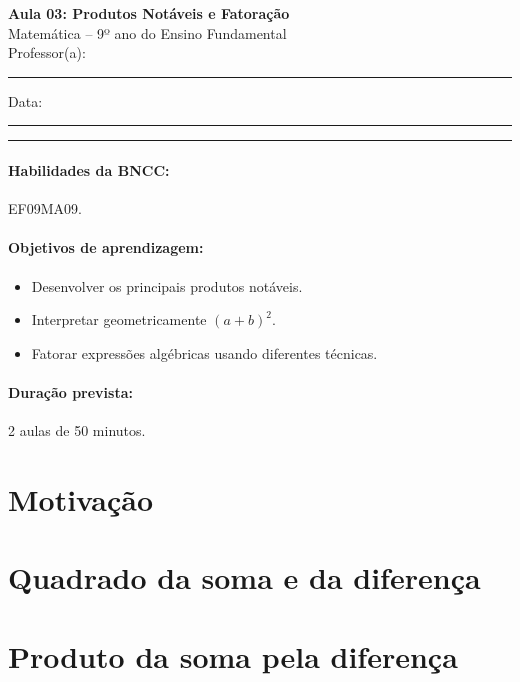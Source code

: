 \documentclass[11pt,a4paper]{article}
\newcommand{\numaula}{03}
\newcommand{\tituloaula}{Produtos Notáveis e Fatoração}
\begin{document}
\begin{center}
  {\Large\bfseries Aula \numaula: \tituloaula}\\[4pt]
  {\large Matemática -- 9º ano do Ensino Fundamental}\\[2pt]
  Professor(a): \rule{6cm}{0.4pt} \qquad Data: \rule{3cm}{0.4pt}
\end{center}
\noindent\rule{\linewidth}{0.8pt}

\paragraph{Habilidades da BNCC:} EF09MA09.

\paragraph{Objetivos de aprendizagem:}
\begin{itemize}[nosep]
  \item Desenvolver os principais produtos notáveis.
  \item Interpretar geometricamente $(a+b)^2$.
  \item Fatorar expressões algébricas usando diferentes técnicas.
\end{itemize}

\paragraph{Duração prevista:} 2 aulas de 50 minutos. %

\section{Motivação}

\section{Quadrado da soma e da diferença}

\section{Produto da soma pela diferença}
\end{document}
